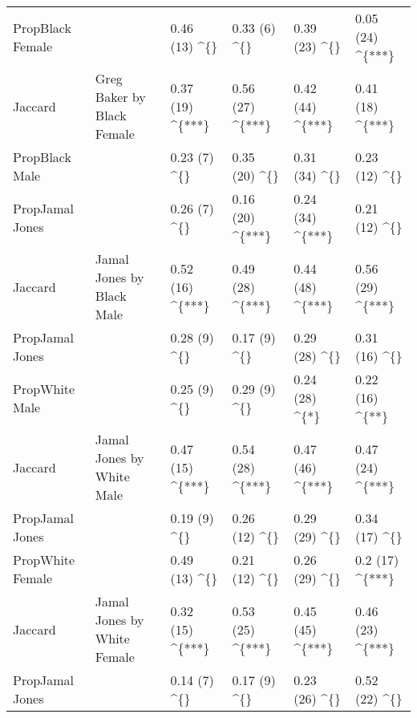 \begin{table}
\begin{tabular}{llllll}
PropBlack Female &  & 0.46 (13) \textasciicircum{}\{\} & 0.33 (6) \textasciicircum{}\{\} & 0.39 (23) \textasciicircum{}\{\} & 0.05 (24) \textasciicircum{}\{***\}\\

Jaccard & \multirow{-3}{*}{\raggedright\arraybackslash Greg Baker by Black Female} & 0.37 (19) \textasciicircum{}\{***\} & 0.56 (27) \textasciicircum{}\{***\} & 0.42 (44) \textasciicircum{}\{***\} & 0.41 (18) \textasciicircum{}\{***\}\\
\cmidrule{1-6}
PropBlack Male &  & 0.23 (7) \textasciicircum{}\{\} & 0.35 (20) \textasciicircum{}\{\} & 0.31 (34) \textasciicircum{}\{\} & 0.23 (12) \textasciicircum{}\{\}\\

PropJamal Jones &  & 0.26 (7) \textasciicircum{}\{\} & 0.16 (20) \textasciicircum{}\{***\} & 0.24 (34) \textasciicircum{}\{***\} & 0.21 (12) \textasciicircum{}\{\}\\

Jaccard & \multirow{-3}{*}{\raggedright\arraybackslash Jamal Jones by Black Male} & 0.52 (16) \textasciicircum{}\{***\} & 0.49 (28) \textasciicircum{}\{***\} & 0.44 (48) \textasciicircum{}\{***\} & 0.56 (29) \textasciicircum{}\{***\}\\
\cmidrule{1-6}
PropJamal Jones &  & 0.28 (9) \textasciicircum{}\{\} & 0.17 (9) \textasciicircum{}\{\} & 0.29 (28) \textasciicircum{}\{\} & 0.31 (16) \textasciicircum{}\{\}\\

PropWhite Male &  & 0.25 (9) \textasciicircum{}\{\} & 0.29 (9) \textasciicircum{}\{\} & 0.24 (28) \textasciicircum{}\{*\} & 0.22 (16) \textasciicircum{}\{**\}\\

Jaccard & \multirow{-3}{*}{\raggedright\arraybackslash Jamal Jones by White Male} & 0.47 (15) \textasciicircum{}\{***\} & 0.54 (28) \textasciicircum{}\{***\} & 0.47 (46) \textasciicircum{}\{***\} & 0.47 (24) \textasciicircum{}\{***\}\\
\cmidrule{1-6}
PropJamal Jones &  & 0.19 (9) \textasciicircum{}\{\} & 0.26 (12) \textasciicircum{}\{\} & 0.29 (29) \textasciicircum{}\{\} & 0.34 (17) \textasciicircum{}\{\}\\

PropWhite Female &  & 0.49 (13) \textasciicircum{}\{\} & 0.21 (12) \textasciicircum{}\{\} & 0.26 (29) \textasciicircum{}\{\} & 0.2 (17) \textasciicircum{}\{***\}\\

Jaccard & \multirow{-3}{*}{\raggedright\arraybackslash Jamal Jones by White Female} & 0.32 (15) \textasciicircum{}\{***\} & 0.53 (25) \textasciicircum{}\{***\} & 0.45 (45) \textasciicircum{}\{***\} & 0.46 (23) \textasciicircum{}\{***\}\\
\cmidrule{1-6}
PropJamal Jones &  & 0.14 (7) \textasciicircum{}\{\} & 0.17 (9) \textasciicircum{}\{\} & 0.23 (26) \textasciicircum{}\{\} & 0.52 (22) \textasciicircum{}\{\}\\


\end{tabular}
\end{table}
